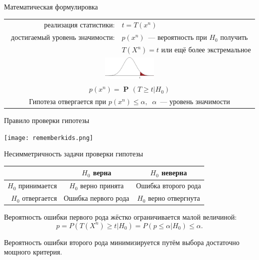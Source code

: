 \documentclass[9pt,pdf,utf8,hyperref={unicode},aspectratio=169]{beamer}
\DeclareMathOperator{\prob}{\mathbf{P}\!}
\renewcommand{\leq}{\leqslant}
\renewcommand{\geq}{\geqslant}
\begin{document}
\begin{frame}{Математическая формулировка}
\begin{center}
\begin{tabular}{rl}
		реализация статистики:          & $t = T \left(x^n\right)$ \\
		достигаемый уровень значимости: & $p\left(x^n\right)$~--- вероятность при $H_0$ получить \\
		& $T \left(X^n\right)=t$ или ещё более экстремальное\\
		\multicolumn{2}{c}{\includegraphics[width=0.2\textwidth]{stats2.png}} \\
		\multicolumn{2}{c}{ $p\left(x^n\right) = \prob\left(T\geq t\left|H_0\right.\right)$ } \\
		\multicolumn{2}{c}{Гипотеза отвергается при $p\left(x^n\right)\leq\alpha,\;\;\alpha$~--- уровень значимости} \\
	\end{tabular}
\end{center}
\end{frame}

\begin{frame}{Правило проверки гипотезы}
    \vspace{-3pt}
    \begin{center}
     	\texttt{[image: rememberkids.png]}
    \end{center}
\end{frame}

\begin{frame}{Несимметричность задачи проверки гипотезы}

    \begin{center}
        \begin{tabular}{ |r | c | c | }
        \hline
                          & $H_0$ верна         & $H_0$ неверна \\ \hline
        $H_0$ принимается & $H_0$ верно принята & Ошибка второго рода \\ \hline
        $H_0$ отвергается & Ошибка первого рода & $H_0$ верно отвергнута\\
        \hline
        \end{tabular}
    \end{center}

    \bigskip

    Вероятность ошибки первого рода жёстко ограничивается малой величиной:
    $$p = P\left(T\left(X^n\right)\geq t \left|H_0\right.\right) = P\left(p\leq\alpha\left|H_0\right.\right) \leq \alpha.$$

    \bigskip

    Вероятность ошибки второго рода минимизируется путём выбора достаточно мощного критерия.
\end{frame}
\end{document}
